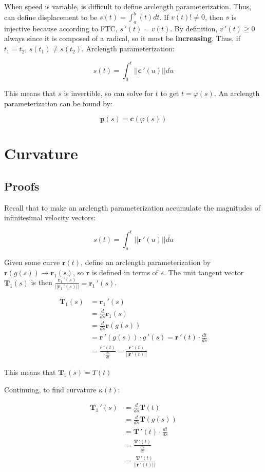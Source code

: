 \noindent
When speed is variable, is difficult to define arclength parameterization.
Thus, can define displacement to be $s(t)=\int_a^b (t)dt$. If $v(t)!\neq 0$,
then $s$ is injective because according to FTC, $s\,'(t)=v(t)$.
By definition, $v\,'(t)\geq 0$ always since it is composed of a radical, so it must be \textbf{increasing}.
Thus, if $t_1=t_2$, $s(t_1)\neq s(t_2)$. Arclength parameterization:

\[s(t)=\int_0^t||\textbf{c}\,'(u)||du\]

\noindent
This means that $s$ is invertible, so can solve for $t$ to get $t=\varphi(s)$.
An arclength parameterization can be found by:

\[\boxed{\textbf{p}(s)=\textbf{c}(\varphi(s))}\]

\section{Curvature}

\subsection{Proofs}

Recall that to make an arclength parameterization accumulate the magnitudes of infinitesimal velocity vectors:

\[s(t)=\int_a^t ||\textbf{r}\,'(u)||du\]

Given some curve $\textbf{r}(t)$, define an arclength parameterization by $\textbf{r}(g(s))\rightarrow \textbf{r}_1(s)$, so 
$\textbf{r}$ is defined in terms of $s$. The unit tangent vector $\textbf{T}_1(s)$ is then $\frac{\textbf{r}_1\,'(s)}{||\textbf{r}_1\,'(s)||}=\textbf{r}_1\,'(s)$.

\begin{align*}
    \textbf{T}_1(s)&=\textbf{r}_1\,'(s)\\
    &=\frac{d}{ds}\textbf{r}_1(s)\\
    &=\frac{d}{ds}\textbf{r}(g(s))\\
    &=\textbf{r}\,'(g(s))\cdot g\,'(s)=\textbf{r}\,'(t)\cdot \frac{dt}{ds}\\
    &=\frac{\textbf{r}\,'(t)}{\frac{ds}{dt}}=\frac{\textbf{r}\,'(t)}{||\textbf{r}\,'(t)||}
\end{align*}

This means that $\textbf{T}_1(s)=T(t)$

Continuing, to find curvature $\kappa(t)$:

\begin{align*}
    \textbf{T}_1\,'(s)&=\frac{d}{ds}\textbf{T}(t)\\
    &=\frac{d}{ds}\textbf{T}(g(s))\\
    &=\textbf{T}\,'(t)\cdot \frac{dt}{ds}\\
    &=\frac{\textbf{T}\,'(t)}{\frac{ds}{dt}}\\
    &=\frac{\textbf{T}\,'(t)}{||\textbf{r}\,'(t)||}\\
\end{align*}

